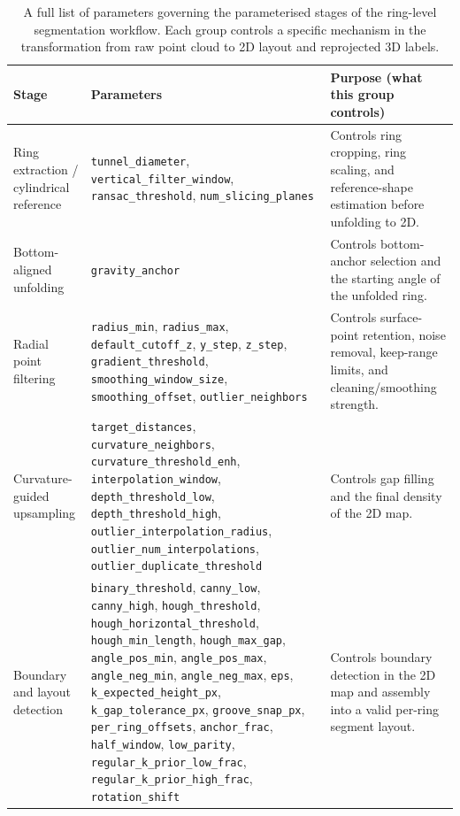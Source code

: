 \documentclass[a4paper,fleqn]{cas-dc}
\begin{document}
{%
\begin{table}[t]
\caption{
A full list of parameters governing the parameterised stages of the ring-level segmentation workflow.
Each group controls a specific mechanism in the transformation from raw point cloud to 2D layout and reprojected 3D labels.
}
\label{tab:workflow_critical_parameters}
\centering
\footnotesize
\begin{tabular}{p{}p{}p{}}
\toprule
Stage & Parameters & Purpose (what this group controls) \\
\midrule
Ring extraction / cylindrical reference
& \texttt{tunnel\_diameter}, \texttt{vertical\_filter\_window}, \texttt{ransac\_threshold}, \texttt{num\_slicing\_planes}
& Controls ring cropping, ring scaling, and reference-shape estimation before unfolding to 2D. \\
\addlinespace
Bottom-aligned unfolding
& \texttt{gravity\_anchor}
& Controls bottom-anchor selection and the starting angle of the unfolded ring. \\
\addlinespace
Radial point filtering
& \texttt{radius\_min}, \texttt{radius\_max}, \texttt{default\_cutoff\_z}, \texttt{y\_step}, \texttt{z\_step}, \texttt{gradient\_threshold}, \texttt{smoothing\_window\_size}, \texttt{smoothing\_offset}, \texttt{outlier\_neighbors}
& Controls surface-point retention, noise removal, keep-range limits, and cleaning/smoothing strength. \\
\addlinespace
Curvature-guided upsampling
& \texttt{target\_distances}, \texttt{curvature\_neighbors}, \texttt{curvature\_threshold\_enh}, \texttt{interpolation\_window}, \texttt{depth\_threshold\_low}, \texttt{depth\_threshold\_high}, \texttt{outlier\_interpolation\_radius}, \texttt{outlier\_num\_interpolations}, \texttt{outlier\_duplicate\_threshold}
& Controls gap filling and the final density of the 2D map. \\
\addlinespace
Boundary and layout detection
& \texttt{binary\_threshold}, \texttt{canny\_low}, \texttt{canny\_high}, \texttt{hough\_threshold}, \texttt{hough\_horizontal\_threshold}, \texttt{hough\_min\_length}, \texttt{hough\_max\_gap}, \texttt{angle\_pos\_min}, \texttt{angle\_pos\_max}, \texttt{angle\_neg\_min}, \texttt{angle\_neg\_max}, \texttt{eps}, \texttt{k\_expected\_height\_px}, \texttt{k\_gap\_tolerance\_px}, \texttt{groove\_snap\_px}, \texttt{per\_ring\_offsets}, \texttt{anchor\_frac}, \texttt{half\_window}, \texttt{low\_parity}, \texttt{regular\_k\_prior\_low\_frac}, \texttt{regular\_k\_prior\_high\_frac}, \texttt{rotation\_shift}
& Controls boundary detection in the 2D map and assembly into a valid per-ring segment layout. \\
\bottomrule
\end{tabular}
\end{table}

}
\end{document}
